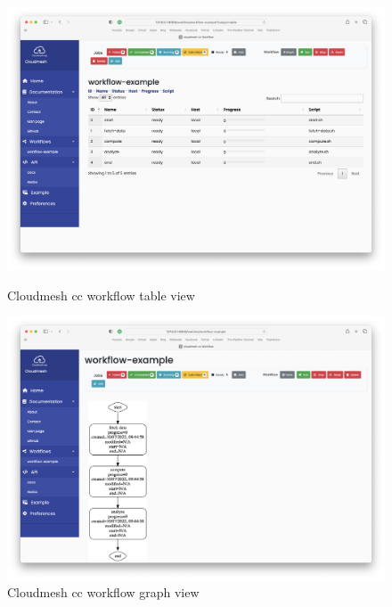 \begin{figure}[htb]
\centering
\includegraphics[width=1.05\columnwidth]{images/service-table.png}
\caption{Cloudmesh cc workflow table view}

\includegraphics[width=1.05\columnwidth]{images/service-graph.png}
\caption{Cloudmesh cc workflow graph view}
\end{figure}
